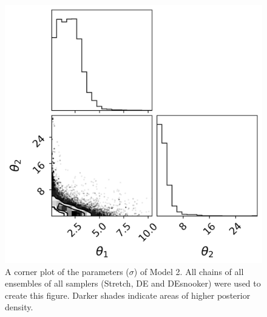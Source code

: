 \begin{figure}[ht]
\begin{minipage}[b]{0.45\textwidth}
    \includegraphics[width=\textwidth]{Figures/appendix_figs/C1.4 corner plot Model 2.png}
    \caption{A corner plot of the parameters ($\sigma$) of Model 2. All chains of all ensembles of all samplers (Stretch, DE and DEsnooker) were used to create this figure. Darker shades indicate areas of higher posterior density.}\label{fig_logbook_1.4_corner_model2}
\end{minipage}
\end{figure}

